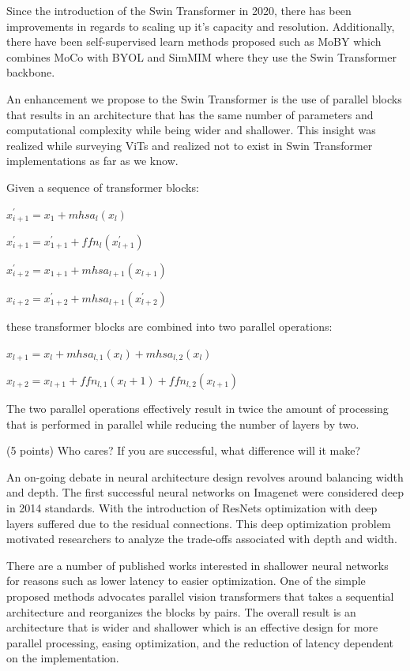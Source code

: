 \documentclass[10pt,twocolumn,letterpaper]{article}
\begin{document}
Since the introduction of the Swin Transformer in 2020, there has been improvements in regards to scaling up it's capacity and resolution\cite{liu2021swinV2}. Additionally, there have been self-supervised learn methods proposed such as MoBY\cite{xie2021moby} which combines MoCo\cite{he2020momentum}\cite{chen2020improved} with BYOL\cite{grill2020bootstrap} and SimMIM\cite{xie2021simmim} where they use the Swin Transformer backbone.

An enhancement we propose to the Swin Transformer is the use of parallel blocks that results in an architecture that has the same number of parameters and computational complexity while being wider and shallower. This insight was realized while surveying ViTs\cite{touvron2022three} and realized not to exist in Swin Transformer implementations as far as we know.

Given a sequence of transformer blocks:

$x^{'}_{i+1} = x_1 + mhsa_l(x_l)$

$x^{'}_{i+1} = x^{'}_{1+1} + ffn_l(x^{'}_{l+1})$

$x^{'}_{i+2} = x_{1+1} + mhsa_{l+1}(x_{l+1})$

$x_{i+2} = x^{'}_{1+2} + mhsa_{l+1}(x^{'}_{l+2})$

these transformer blocks are combined into two parallel operations:

$x_{l+1} = x_{l} + mhsa_{l,1}(x_l) + mhsa_{l,2}(x_l)$

$x_{l+2} = x_{l+1} + ffn_{l,1}(x_l+1) + ffn_{l,2}(x_{l+1})$

The two parallel operations effectively result in twice the amount of processing that is performed in parallel while reducing the number of layers by two.

(5 points) Who cares? If you are successful, what difference will it make? 

An on-going debate in neural architecture design revolves around balancing width and depth. The first successful neural networks on Imagenet were considered deep in 2014 standards\cite{krizhevsky2012imagenet}\cite{simonyan2014very}. With the introduction of ResNets\cite{he2016deep}\cite{he2016identity} optimization with deep layers suffered due to the residual connections. This deep optimization problem motivated researchers to analyze the trade-offs associated with depth and width\cite{ding2021repvgg}\cite{huang2016deep}\cite{zagoruyko2016wide}. 

There are a number of published works interested in shallower neural networks\cite{goyal2021non}\cite{zagoruyko2016wide} for reasons such as lower latency to easier optimization. One of the simple proposed methods advocates parallel vision transformers\cite{touvron2022three} that takes a sequential architecture and reorganizes the blocks by pairs. The overall result is an architecture that is wider and shallower which is an effective design for more parallel processing, easing optimization, and the reduction of latency dependent on the implementation.
\end{document}
